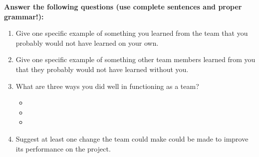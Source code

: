 \documentclass[12pt]{article}
\begin{document}
\newpage
\noindent\textbf{Answer the following questions (use complete sentences and proper grammar!):}
\begin{enumerate}
	\item Give one specific example of something you learned from the team that you probably would not have learned on your own. 
	\vspace*{3.5cm}
	\item Give one specific example of something other team members learned from you that they probably would not have learned without you. 
	\vspace*{3.5cm}
	\item What are three ways you did well in functioning as a team? 
	\begin{itemize}
		\item
		\vspace*{1cm}
		\item 
		\vspace*{1cm}
		\item\vspace*{1cm}
	\end{itemize}
	\vspace*{1cm}
	\item Suggest at least one change the team could make could be made to improve its performance on the project. 
\end{enumerate}
	
\end{document}

